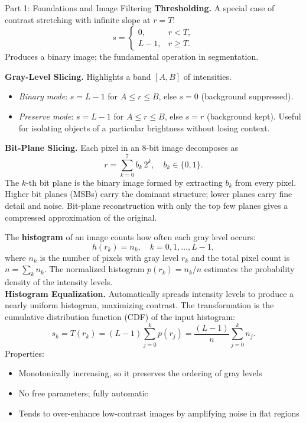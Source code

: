 \documentclass[letterpaper]{article}
\begin{document}
\begin{notes}{Part 1: Foundations and Image Filtering}
\textbf{Thresholding.} A special case of contrast stretching with infinite slope at $r=T$:
$$
s = \begin{cases}
0, & r < T,\\
L-1, & r \ge T.
\end{cases}
$$
Produces a binary image; the fundamental operation in segmentation.

\textbf{Gray-Level Slicing.} Highlights a band $[A,B]$ of intensities.
\begin{itemize}
    \item \emph{Binary mode}: $s = L-1$ for $A\le r\le B$, else $s=0$ (background suppressed).
    \item \emph{Preserve mode}: $s = L-1$ for $A\le r\le B$, else $s=r$ (background kept). Useful for isolating objects of a particular brightness without losing context.
\end{itemize}

\textbf{Bit-Plane Slicing.} Each pixel in an 8-bit image decomposes as
$$
r = \sum_{k=0}^{7} b_k \, 2^k, \quad b_k\in\{0,1\}.
$$
The $k$-th bit plane is the binary image formed by extracting $b_k$ from every pixel. Higher bit planes (MSBs) carry the dominant structure; lower planes carry fine detail and noise. Bit-plane reconstruction with only the top few planes gives a compressed approximation of the original.


The \textbf{histogram} of an image counts how often each gray level occurs:
$$
h(r_k) = n_k, \quad k = 0, 1, \dots, L-1,
$$
where $n_k$ is the number of pixels with gray level $r_k$ and the total pixel count is $n = \sum_k n_k$. The normalized histogram $p(r_k) = n_k/n$ estimates the probability density of the intensity levels.\\

\textbf{Histogram Equalization.} Automatically spreads intensity levels to produce a nearly uniform histogram, maximizing contrast. The transformation is the cumulative distribution function (CDF) of the input histogram:
$$
s_k = T(r_k) = (L-1)\sum_{j=0}^{k} p(r_j) = \frac{(L-1)}{n}\sum_{j=0}^{k} n_j.
$$
Properties:
\begin{itemize}
    \item Monotonically increasing, so it preserves the ordering of gray levels
    \item No free parameters; fully automatic
    \item Tends to over-enhance low-contrast images by amplifying noise in flat regions
\end{itemize}


\end{notes}
\end{document}
